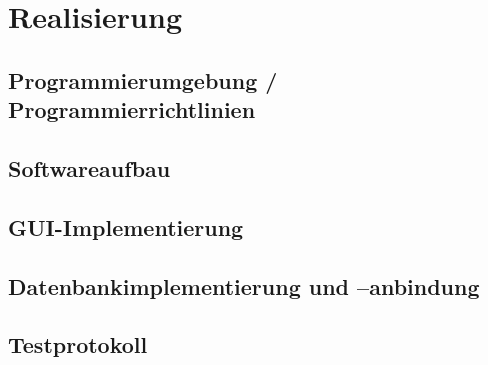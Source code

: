 \section{Realisierung}

\subsection{Programmierumgebung / Programmierrichtlinien}
\subsection{Softwareaufbau}
\subsection{GUI-Implementierung}
\subsection{Datenbankimplementierung und –anbindung}
\subsection{Testprotokoll}
